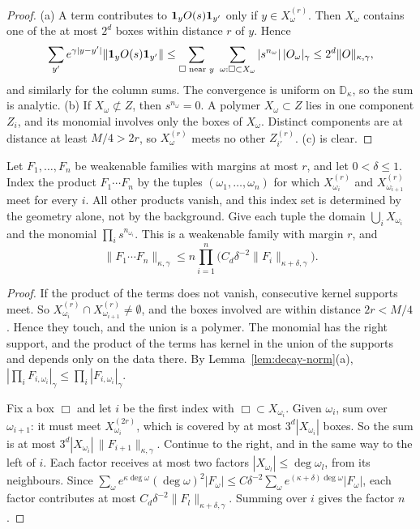 \begin{proof}
(a) A term contributes to $\mathbf 1_yO(s)\mathbf 1_{y'}$ only if $y\in X_\omega^{(r)}$. Then $X_\omega$ contains one of the at most $2^d$ boxes within distance $r$ of $y$. Hence
\[
\sum_{y'}e^{\gamma|y-y'|}\|\mathbf 1_yO(s)\mathbf 1_{y'}\|\le\sum_{\Box\text{ near }y}\ \sum_{\omega:\Box\subset X_\omega}|s^{n_\omega}|\,|O_\omega|_\gamma\le2^d\|O\|_{\kappa,\gamma},
\]
and similarly for the column sums. The convergence is uniform on $\mathbb D_\kappa$, so the sum is analytic. (b) If $X_\omega\not\subset Z$, then $s^{n_\omega}=0$. A polymer $X_\omega\subset Z$ lies in one component $Z_i$, and its monomial involves only the boxes of $X_\omega$. Distinct components are at distance at least $M/4>2r$, so $X_\omega^{(r)}$ meets no other $Z_{i'}^{(r)}$. (c) is clear.
\end{proof}

\begin{lemma}[Products]\label{lem:weak-chain}
Let $F_1,\dots,F_n$ be weakenable families with margins at most $r$, and let $0<\delta\le1$. Index the product $F_1\cdots F_n$ by the tuples $(\omega_1,\dots,\omega_n)$ for which $X^{(r)}_{\omega_i}$ and $X^{(r)}_{\omega_{i+1}}$ meet for every $i$. All other products vanish, and this index set is determined by the geometry alone, not by the background. Give each tuple the domain $\bigcup_iX_{\omega_i}$ and the monomial $\prod_is^{n_{\omega_i}}$. This is a weakenable family with margin $r$, and
\[
\|F_1\cdots F_n\|_{\kappa,\gamma}\le n\prod_{i=1}^n\big(C_d\delta^{-2}\|F_i\|_{\kappa+\delta,\gamma}\big).
\]
\end{lemma}

\begin{proof}
If the product of the terms does not vanish, consecutive kernel supports meet. So $X_{\omega_i}^{(r)}\cap X_{\omega_{i+1}}^{(r)}\ne\emptyset$, and the boxes involved are within distance $2r<M/4$. Hence they touch, and the union is a polymer. The monomial has the right support, and the product of the terms has kernel in the union of the supports and depends only on the data there. By Lemma~\ref{lem:decay-norm}(a), $|\prod_iF_{i,\omega_i}|_\gamma\le\prod_i|F_{i,\omega_i}|_\gamma$.

Fix a box $\Box$ and let $i$ be the first index with $\Box\subset X_{\omega_i}$. Given $\omega_i$, sum over $\omega_{i+1}$: it must meet $X_{\omega_i}^{(2r)}$, which is covered by at most $3^d|X_{\omega_i}|$ boxes. So the sum is at most $3^d|X_{\omega_i}|\,\|F_{i+1}\|_{\kappa,\gamma}$. Continue to the right, and in the same way to the left of $i$. Each factor receives at most two factors $|X_{\omega_l}|\le\deg\omega_l$, from its neighbours. Since $\sum_\omega e^{\kappa\deg\omega}(\deg\omega)^2|F_\omega|\le C\delta^{-2}\sum_\omega e^{(\kappa+\delta)\deg\omega}|F_\omega|$, each factor contributes at most $C_d\delta^{-2}\|F_l\|_{\kappa+\delta,\gamma}$. Summing over $i$ gives the factor $n$.
\end{proof}


